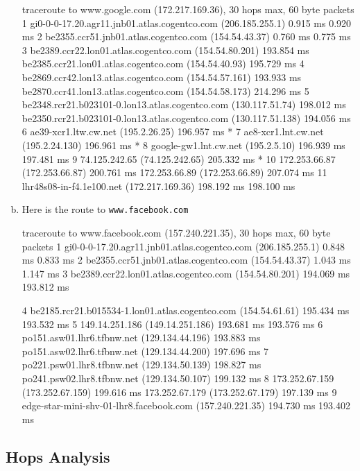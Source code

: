 \documentclass{article}
\begin{document}
\begin{enumerate}[a.]
\begin{code}
traceroute to www.google.com (172.217.169.36), 30 hops max, 60 byte packets
 1  gi0-0-0-17.20.agr11.jnb01.atlas.cogentco.com (206.185.255.1)  0.915 ms  0.920 ms
 2  be2355.ccr51.jnb01.atlas.cogentco.com (154.54.43.37)  0.760 ms  0.775 ms
 3  be2389.ccr22.lon01.atlas.cogentco.com (154.54.80.201)  193.854 ms be2385.ccr21.lon01.atlas.cogentco.com (154.54.40.93)  195.729 ms
 4  be2869.ccr42.lon13.atlas.cogentco.com (154.54.57.161)  193.933 ms be2870.ccr41.lon13.atlas.cogentco.com (154.54.58.173)  214.296 ms
 5  be2348.rcr21.b023101-0.lon13.atlas.cogentco.com (130.117.51.74)  198.012 ms be2350.rcr21.b023101-0.lon13.atlas.cogentco.com (130.117.51.138)  194.056 ms
 6  ae39-xcr1.ltw.cw.net (195.2.26.25)  196.957 ms *
 7  ae8-xcr1.lnt.cw.net (195.2.24.130)  196.961 ms *
 8  google-gw1.lnt.cw.net (195.2.5.10)  196.939 ms  197.481 ms
 9  74.125.242.65 (74.125.242.65)  205.332 ms *
10  172.253.66.87 (172.253.66.87)  200.761 ms 172.253.66.89 (172.253.66.89)  207.074 ms
11  lhr48s08-in-f4.1e100.net (172.217.169.36)  198.192 ms  198.100 ms
\end{code}
\item Here is the route to {\tt www.facebook.com}
\begin{code}
traceroute to www.facebook.com (157.240.221.35), 30 hops max, 60 byte packets
 1  gi0-0-0-17.20.agr11.jnb01.atlas.cogentco.com (206.185.255.1)  0.848 ms  0.833 ms
 2  be2355.ccr51.jnb01.atlas.cogentco.com (154.54.43.37)  1.043 ms  1.147 ms
 3  be2389.ccr22.lon01.atlas.cogentco.com (154.54.80.201)  194.069 ms  193.812 ms
 \end{code}
 \begin{code}
 4  be2185.rcr21.b015534-1.lon01.atlas.cogentco.com (154.54.61.61)  195.434 ms  193.532 ms
 5  149.14.251.186 (149.14.251.186)  193.681 ms  193.576 ms
 6  po151.asw01.lhr6.tfbnw.net (129.134.44.196)  193.883 ms po151.asw02.lhr6.tfbnw.net (129.134.44.200)  197.696 ms
 7  po221.psw01.lhr8.tfbnw.net (129.134.50.139)  198.827 ms po241.psw02.lhr8.tfbnw.net (129.134.50.107)  199.132 ms
 8  173.252.67.159 (173.252.67.159)  199.616 ms 173.252.67.179 (173.252.67.179)  197.139 ms
 9  edge-star-mini-shv-01-lhr8.facebook.com (157.240.221.35)  194.730 ms  193.402 ms
\end{code}
\end{enumerate}

\subsection*{Hops Analysis}
\end{document}
